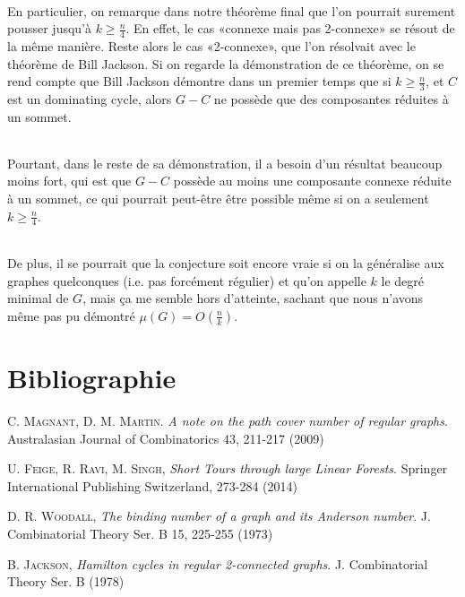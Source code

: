 \documentclass[a4paper]{article}
\theoremstyle{definition}
\theoremstyle{remark}
\begin{document}
\paragraph{}
En particulier, on remarque dans notre théorème final que l'on pourrait 
surement pousser jusqu'à $k \geq \frac{n}{4}$. En effet, le cas
 «connexe mais pas 2-connexe» se résout de la même manière. Reste alors 
le cas «2-connexe», que l'on résolvait avec le théorème de Bill Jackson.
Si on regarde la démonstration de ce théorème, on se rend compte que 
Bill Jackson démontre dans un premier temps que si $k \geq \frac{n}{3}$, et $C$ est un dominating cycle, alors $G-C$ ne possède que des composantes réduites à un sommet. 

\paragraph{}
Pourtant, dans le reste de sa démonstration, il a besoin d'un résultat beaucoup moins fort, qui est
que $G-C$ possède au moins une composante connexe réduite à un sommet, ce
qui pourrait peut-être être possible même si on a seulement $k \geq \frac{n}{4}$.

\paragraph{}
De plus, il se pourrait que la conjecture soit encore vraie si on la 
généralise aux graphes quelconques (i.e. pas forcément régulier) et 
qu'on appelle $k$ le degré minimal de $G$, mais ça me semble hors 
d'atteinte, sachant que nous n'avons même pas pu démontré $\mu(G)=O(\frac{n}{k})$.

\part{Bibliographie}
\begin{thebibliography}{}
     C. \textsc {Magnant}, D. M. \textsc{Martin}. \emph{A note on the path cover number of regular graphs}. Australasian Journal of Combinatorics 43, 211-217 (2009)

 U. \textsc {Feige}, R. \textsc{Ravi}, M. \textsc{Singh}, \emph{Short Tours through large Linear Forests}. Springer International Publishing Switzerland, 273-284 (2014)

 D. R. \textsc {Woodall}, \emph{The binding number of a graph and its Anderson number}. J. Combinatorial Theory Ser. B 15, 225-255 (1973)

 B. \textsc {Jackson}, \emph{Hamilton cycles in regular 2-connected graphs}. J. Combinatorial Theory Ser. B (1978)

\end{thebibliography}
\end{document}
